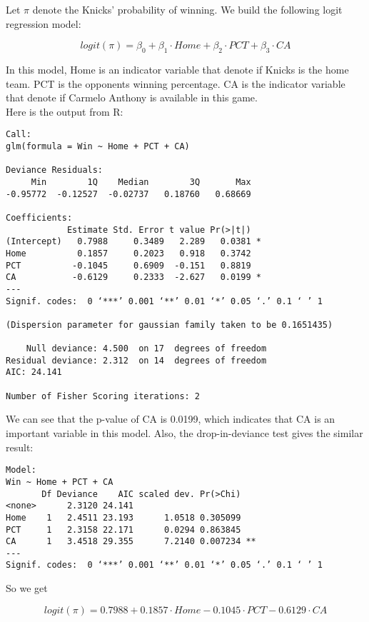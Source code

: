 \documentclass[12pt]{article}
\begin{document}
Let $\pi$ denote the Knicks' probability of winning. We build the
following logit regression model:

\begin{equation*}
logit(\pi) = \beta_0 + \beta_1 \cdot Home + \beta_2 \cdot PCT +
\beta_3 \cdot CA
\end{equation*}

In this model, Home is an indicator variable that denote if Knicks is
the home team. PCT is the opponents winning percentage.  CA is the
indicator variable that denote if Carmelo Anthony is available in this
game. \\

Here is the output from R:

\begin{verbatim}
Call:
glm(formula = Win ~ Home + PCT + CA)

Deviance Residuals: 
     Min        1Q    Median        3Q       Max  
-0.95772  -0.12527  -0.02737   0.18760   0.68669  

Coefficients:
            Estimate Std. Error t value Pr(>|t|)  
(Intercept)   0.7988     0.3489   2.289   0.0381 *
Home          0.1857     0.2023   0.918   0.3742  
PCT          -0.1045     0.6909  -0.151   0.8819  
CA           -0.6129     0.2333  -2.627   0.0199 *
---
Signif. codes:  0 ‘***’ 0.001 ‘**’ 0.01 ‘*’ 0.05 ‘.’ 0.1 ‘ ’ 1 

(Dispersion parameter for gaussian family taken to be 0.1651435)

    Null deviance: 4.500  on 17  degrees of freedom
Residual deviance: 2.312  on 14  degrees of freedom
AIC: 24.141

Number of Fisher Scoring iterations: 2
\end{verbatim} 

We can see that the p-value of CA is 0.0199, which indicates that CA
is an important variable in this model. Also, the drop-in-deviance
test gives the similar result:

\begin{verbatim}
Model:
Win ~ Home + PCT + CA
       Df Deviance    AIC scaled dev. Pr(>Chi)   
<none>      2.3120 24.141                        
Home    1   2.4511 23.193      1.0518 0.305099   
PCT     1   2.3158 22.171      0.0294 0.863845   
CA      1   3.4518 29.355      7.2140 0.007234 **
---
Signif. codes:  0 ‘***’ 0.001 ‘**’ 0.01 ‘*’ 0.05 ‘.’ 0.1 ‘ ’ 1 
\end{verbatim} 

So we get

\begin{equation*}
logit(\pi) = 0.7988 + 0.1857 \cdot Home - 0.1045 \cdot PCT -
0.6129 \cdot CA
\end{equation*}
\end{document}
